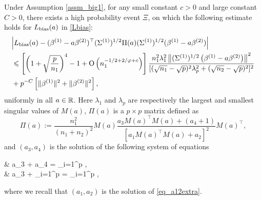 \begin{proposition}\label{prop_main_RMT}
Under Assumption \ref{assm_big1}, for any small constant $c>0$ and large constant $C>0$, there exists a high probability event $\Xi$, on which the following estimate  holds for $L_{\text{bias}}(a)$ in \eqref{Lbias}:
			\begin{align}
				& \bigabs{ L_{\bias}(a) -   (\beta^{(1)}- a\beta^{(2)} )^\top (\Sigma^{(1)})^{1/2} \Pi(a)(\Sigma^{(1)})^{1/2} (\beta^{(1)}- a\beta^{(2)})   }  \nonumber\\
				& \le \left[\left( 1+\sqrt{\frac{p}{n_1}}\right)^4 - 1 +\OO\left( n_1^{-1/2+2/\varphi + c}\right)\right] \frac{n_1^2 \lambda_1^2 \left\|(\Sigma^{(1)})^{1/2} \left(\beta^{(1)}- a\beta^{(2)}\right) \right\|^2}{  [(\sqrt{n_1}-\sqrt{p})^2 \lambda_p^2+ (\sqrt{n_2}-\sqrt{p})^2]^2}  \nonumber\\
				& + p^{-C} \left[\| \beta^{(1)}\|^2 + \| \beta^{(2)}\|^2 \right], \label{lem_cov_derv_eq}
			\end{align}
				uniformly in all $a\in \mathbb{R}$. Here $\lambda_1$ and $\lambda_p$ are respectively the largest and smallest singular values of $M(a)$, $\Pi(a)$ is a $p\times p$ matrix defined as
				$$\Pi(a):=\frac{n_1^2}{(n_1+n_2)^2}  M(a)  \frac{a_3 M(a)^\top M(a) + (a_4 + 1) }{[a_1 M(a)^\top M(a) + a_2 ]^2} M(a)^\top  ,$$
				 and $(a_{3},a_4)$ is the solution of the following system of equations %
		\be  \label{eq_a34extra}
		\begin{split}
				& a_3 + a_4 = \sum_{i=1}^p , \\
				& a_3 +  \sum_{i=1}^p  =  \sum_{i=1}^p ,
			\end{split}
			\ee
			where we recall that $(a_1,a_2)$ is the solution of \eqref{eq_a12extra}.
\end{proposition}

